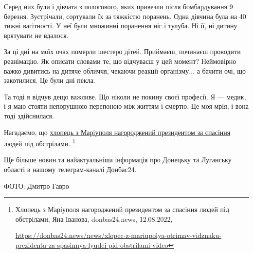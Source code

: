 Серед них були і дівчата з пологового, яких привезли після бомбардування 9
березня. Зустрічали, сортували їх за тяжкістю поранень. Одна дівчина була на 40
тижні вагітності. У неї були множинні поранення ніг і тулуба. Ні її, ні дитину
врятувати не вдалося.

За ці дні на моїх очах померли шестеро дітей. Приймаєш, починаєш проводити
реанімацію. Як описати словами те, що відчуваєш у цей момент? Неймовірно важко
дивитись на дитяче обличчя, чекаючи реакції організму... а бачити очі, що
закотилися. Це були дні пекла.

Та тоді я відчув дещо важливе. Що ніколи не покину своєї професії. Я — медик, і
я маю стояти непорушною перепоною між життям і смертю. Це моя мрія, і вона тоді
здійснилася.

Нагадаємо, що \href{https://donbas24.news/news/xlopec-z-mariupolya-otrimav-vidznaku-prezidenta-za-spasinnya-lyudei-pid-obstrilami-video}{хлопець з Маріуполя нагороджений президентом за спасіння людей
під обстрілами}.%
\footnote{Хлопець з Маріуполя нагороджений президентом за спасіння людей під обстрілами, Яна Іванова, donbas24.news, 12.08.2022, \par\url{https://donbas24.news/news/xlopec-z-mariupolya-otrimav-vidznaku-prezidenta-za-spasinnya-lyudei-pid-obstrilami-video}}

Ще більше новин та найактуальніша інформація про Донецьку та Луганську області
в нашому телеграм-каналі Донбас24.

ФОТО: Дмитро Гавро

